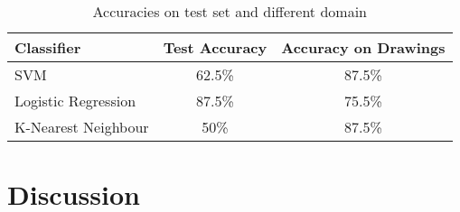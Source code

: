 \documentclass[10pt, a4paper]{article}
\begin{document}
\begin{table}[h]
  \centering
    \begin{tabular}{l|cc}
    Classifier          & Test Accuracy & Accuracy on Drawings \\\hline
    SVM                 & 62.5\%        & 87.5\%               \\
    Logistic Regression & 87.5\%        & 75.5\%               \\
    K-Nearest Neighbour & 50\%          & 87.5\%              
    \end{tabular}
  \caption{Accuracies on test set and different domain}
  \label{fig:testDomainAcc}
\end{table}
\section{Discussion}



\end{document}
